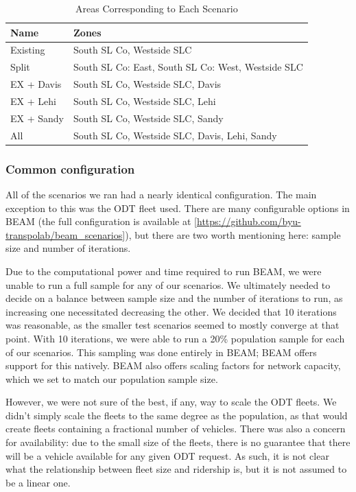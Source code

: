 \documentclass[
]{article}
\begin{document}
\begin{table}

\caption{\label{tab:scenarios-info}Areas Corresponding to Each Scenario}
\centering
\begin{tabular}[t]{ll}
\toprule
Name & Zones\\
\midrule
Existing & South SL Co, Westside SLC\\
Split & South SL Co: East, South SL Co: West, Westside SLC\\
EX + Davis & South SL Co, Westside SLC, Davis\\
EX + Lehi & South SL Co, Westside SLC, Lehi\\
EX + Sandy & South SL Co, Westside SLC, Sandy\\
\addlinespace
All & South SL Co, Westside SLC, Davis, Lehi, Sandy\\
\bottomrule
\end{tabular}
\end{table}

\hypertarget{common-configuration}{%
\subsubsection{Common configuration}\label{common-configuration}}

All of the scenarios we ran had a nearly identical configuration. The main exception to this was the ODT fleet used. There are many configurable options in BEAM (the full configuration is available at {[}\url{https://github.com/byu-transpolab/beam_scenarios}{]}), but there are two worth mentioning here: sample size and number of iterations.

Due to the computational power and time required to run BEAM, we were unable to run a full sample for any of our scenarios. We ultimately needed to decide on a balance between sample size and the number of iterations to run, as increasing one necessitated decreasing the other. We decided that 10 iterations was reasonable, as the smaller test scenarios seemed to mostly converge at that point. With 10 iterations, we were able to run a 20\% population sample for each of our scenarios. This sampling was done entirely in BEAM; BEAM offers support for this natively. BEAM also offers scaling factors for network capacity, which we set to match our population sample size.

However, we were not sure of the best, if any, way to scale the ODT fleets. We didn't simply scale the fleets to the same degree as the population, as that would create fleets containing a fractional number of vehicles. There was also a concern for availability: due to the small size of the fleets, there is no guarantee that there will be a vehicle available for any given ODT request. As such, it is not clear what the relationship between fleet size and ridership is, but it is not assumed to be a linear one.
\end{document}
